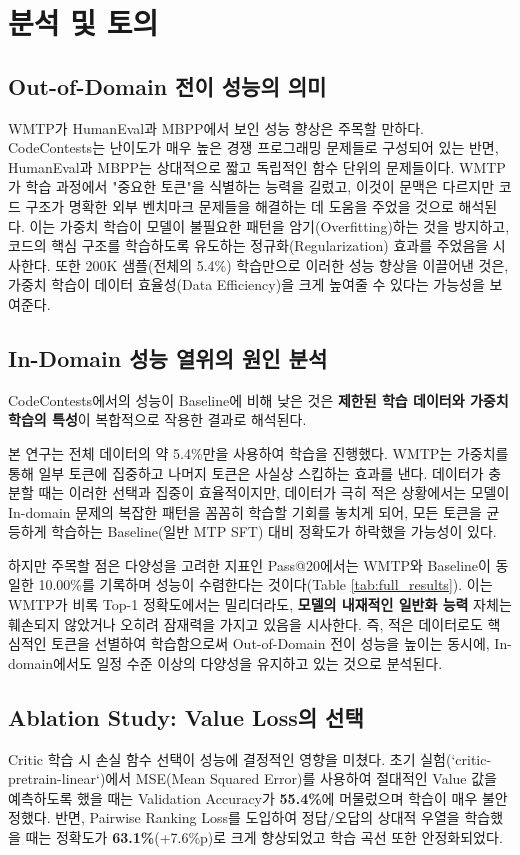 \documentclass[11pt,a4paper]{article}
\begin{document}
\section{분석 및 토의}

\subsection{Out-of-Domain 전이 성능의 의미}
WMTP가 HumanEval과 MBPP에서 보인 성능 향상은 주목할 만하다. CodeContests는 난이도가 매우 높은 경쟁 프로그래밍 문제들로 구성되어 있는 반면, HumanEval과 MBPP는 상대적으로 짧고 독립적인 함수 단위의 문제들이다. WMTP가 학습 과정에서 "중요한 토큰"을 식별하는 능력을 길렀고, 이것이 문맥은 다르지만 코드 구조가 명확한 외부 벤치마크 문제들을 해결하는 데 도움을 주었을 것으로 해석된다. 이는 가중치 학습이 모델이 불필요한 패턴을 암기(Overfitting)하는 것을 방지하고, 코드의 핵심 구조를 학습하도록 유도하는 정규화(Regularization) 효과를 주었음을 시사한다. 또한 200K 샘플(전체의 5.4\%) 학습만으로 이러한 성능 향상을 이끌어낸 것은, 가중치 학습이 데이터 효율성(Data Efficiency)을 크게 높여줄 수 있다는 가능성을 보여준다.

\subsection{In-Domain 성능 열위의 원인 분석}
CodeContests에서의 성능이 Baseline에 비해 낮은 것은 \textbf{제한된 학습 데이터와 가중치 학습의 특성}이 복합적으로 작용한 결과로 해석된다.

본 연구는 전체 데이터의 약 5.4\%만을 사용하여 학습을 진행했다. WMTP는 가중치를 통해 일부 토큰에 집중하고 나머지 토큰은 사실상 스킵하는 효과를 낸다. 데이터가 충분할 때는 이러한 선택과 집중이 효율적이지만, 데이터가 극히 적은 상황에서는 모델이 In-domain 문제의 복잡한 패턴을 꼼꼼히 학습할 기회를 놓치게 되어, 모든 토큰을 균등하게 학습하는 Baseline(일반 MTP SFT) 대비 정확도가 하락했을 가능성이 있다.

하지만 주목할 점은 다양성을 고려한 지표인 Pass@20에서는 WMTP와 Baseline이 동일한 10.00\%를 기록하며 성능이 수렴한다는 것이다(Table \ref{tab:full_results}). 이는 WMTP가 비록 Top-1 정확도에서는 밀리더라도, \textbf{모델의 내재적인 일반화 능력} 자체는 훼손되지 않았거나 오히려 잠재력을 가지고 있음을 시사한다. 즉, 적은 데이터로도 핵심적인 토큰을 선별하여 학습함으로써 Out-of-Domain 전이 성능을 높이는 동시에, In-domain에서도 일정 수준 이상의 다양성을 유지하고 있는 것으로 분석된다.

\subsection{Ablation Study: Value Loss의 선택}
Critic 학습 시 손실 함수 선택이 성능에 결정적인 영향을 미쳤다. 초기 실험(`critic-pretrain-linear`)에서 MSE(Mean Squared Error)를 사용하여 절대적인 Value 값을 예측하도록 했을 때는 Validation Accuracy가 \textbf{55.4\%}에 머물렀으며 학습이 매우 불안정했다. 반면, Pairwise Ranking Loss를 도입하여 정답/오답의 상대적 우열을 학습했을 때는 정확도가 \textbf{63.1\%}(+7.6\%p)로 크게 향상되었고 학습 곡선 또한 안정화되었다.
\end{document}
